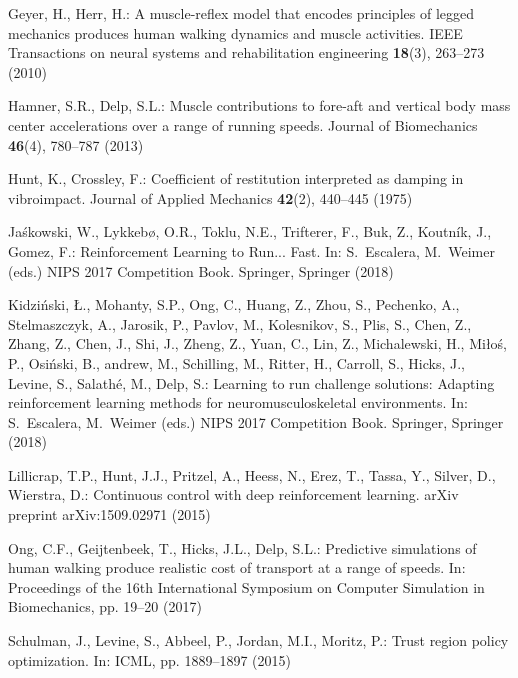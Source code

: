 \documentclass[graybox]{svmult}
\begin{document}
\begin{thebibliography}{10}
Geyer, H., Herr, H.: A muscle-reflex model that encodes principles of legged
  mechanics produces human walking dynamics and muscle activities.
\newblock IEEE Transactions on neural systems and rehabilitation engineering
  \textbf{18}(3), 263--273 (2010)

Hamner, S.R., Delp, S.L.: Muscle contributions to fore-aft and vertical body
  mass center accelerations over a range of running speeds.
\newblock Journal of Biomechanics \textbf{46}(4), 780--787 (2013)

Hunt, K., Crossley, F.: Coefficient of restitution interpreted as damping in
  vibroimpact.
\newblock Journal of Applied Mechanics \textbf{42}(2), 440--445 (1975)

Ja\'skowski, W., Lykkeb{\o}, O.R., Toklu, N.E., Trifterer, F., Buk, Z.,
  Koutn\'{i}k, J., Gomez, F.: {Reinforcement Learning to Run... Fast}.
\newblock In: S.~Escalera, M.~Weimer (eds.) NIPS 2017 Competition Book.
  Springer, Springer (2018)

Kidzi\'nski, {\L}., Mohanty, S.P., Ong, C., Huang, Z., Zhou, S., Pechenko, A.,
  Stelmaszczyk, A., Jarosik, P., Pavlov, M., Kolesnikov, S., Plis, S., Chen,
  Z., Zhang, Z., Chen, J., Shi, J., Zheng, Z., Yuan, C., Lin, Z., Michalewski,
  H., Miłoś, P., Osiński, B., andrew, M., Schilling, M., Ritter, H.,
  Carroll, S., Hicks, J., Levine, S., Salathé, M., Delp, S.: Learning to run
  challenge solutions: Adapting reinforcement learning methods for
  neuromusculoskeletal environments.
\newblock In: S.~Escalera, M.~Weimer (eds.) NIPS 2017 Competition Book.
  Springer, Springer (2018)

Lillicrap, T.P., Hunt, J.J., Pritzel, A., Heess, N., Erez, T., Tassa, Y.,
  Silver, D., Wierstra, D.: Continuous control with deep reinforcement
  learning.
\newblock arXiv preprint arXiv:1509.02971  (2015)

Ong, C.F., Geijtenbeek, T., Hicks, J.L., Delp, S.L.: Predictive simulations of
  human walking produce realistic cost of transport at a range of speeds.
\newblock In: Proceedings of the 16th International Symposium on Computer
  Simulation in Biomechanics, pp. 19--20 (2017)

Schulman, J., Levine, S., Abbeel, P., Jordan, M.I., Moritz, P.: Trust region
  policy optimization.
\newblock In: ICML, pp. 1889--1897 (2015)


\end{thebibliography}
\end{document}
